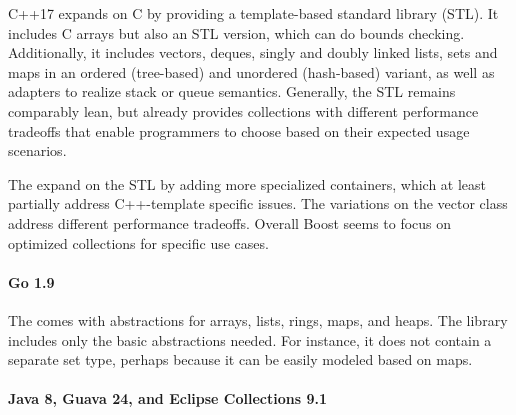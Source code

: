 \documentclass[sigconf, 10pt]{acmart}
\begin{document}
C++17\citep{Cpp17} expands on C
by providing a template-based standard library (STL).
It includes C arrays but also an STL version, which can do bounds checking.
Additionally, it includes vectors, deques, singly and doubly linked lists,
sets and maps in an ordered (tree-based) and unordered (hash-based) variant,
as well as adapters to realize stack or queue semantics.
Generally, the STL remains comparably lean,
but already provides collections with different performance tradeoffs
that enable programmers to choose based on their expected usage scenarios.

The 
expand on the STL by adding more specialized containers,
which at least partially address C++-template specific issues.
The variations on the vector class address different performance tradeoffs.
Overall Boost seems to focus on optimized collections
for specific use cases.

\paragraph{Go 1.9}


The 
comes with abstractions for arrays,
lists, rings, maps, and heaps.
The library includes only the basic abstractions needed.
For instance, it does not contain a separate set type,
perhaps because it can be easily modeled based on maps.

\paragraph{Java 8, Guava 24, and Eclipse Collections 9.1}
\end{document}
